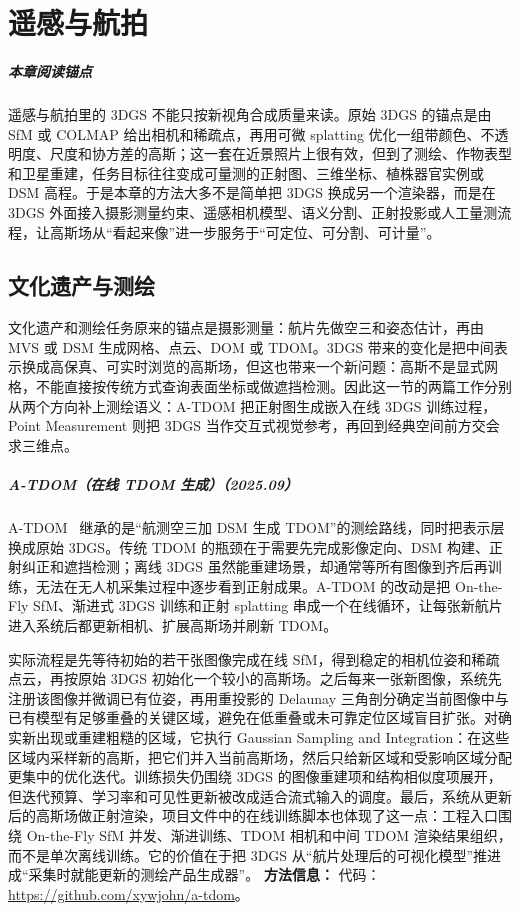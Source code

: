 ﻿\chapter{遥感与航拍}

\paragraph*{本章阅读锚点}
遥感与航拍里的 3DGS 不能只按新视角合成质量来读。原始 3DGS 的锚点是由 SfM 或 COLMAP 给出相机和稀疏点，再用可微 splatting 优化一组带颜色、不透明度、尺度和协方差的高斯；这一套在近景照片上很有效，但到了测绘、作物表型和卫星重建，任务目标往往变成可量测的正射图、三维坐标、植株器官实例或 DSM 高程。于是本章的方法大多不是简单把 3DGS 换成另一个渲染器，而是在 3DGS 外面接入摄影测量约束、遥感相机模型、语义分割、正射投影或人工量测流程，让高斯场从“看起来像”进一步服务于“可定位、可分割、可计量”。

\section{文化遗产与测绘}

文化遗产和测绘任务原来的锚点是摄影测量：航片先做空三和姿态估计，再由 MVS 或 DSM 生成网格、点云、DOM 或 TDOM。3DGS 带来的变化是把中间表示换成高保真、可实时浏览的高斯场，但这也带来一个新问题：高斯不是显式网格，不能直接按传统方式查询表面坐标或做遮挡检测。因此这一节的两篇工作分别从两个方向补上测绘语义：A-TDOM 把正射图生成嵌入在线 3DGS 训练过程，Point Measurement 则把 3DGS 当作交互式视觉参考，再回到经典空间前方交会求三维点。



\paragraph{A-TDOM（在线 TDOM 生成）（2025.09）}
A-TDOM~\cite{2509_12759} 继承的是“航测空三加 DSM 生成 TDOM”的测绘路线，同时把表示层换成原始 3DGS。传统 TDOM 的瓶颈在于需要先完成影像定向、DSM 构建、正射纠正和遮挡检测；离线 3DGS 虽然能重建场景，却通常等所有图像到齐后再训练，无法在无人机采集过程中逐步看到正射成果。A-TDOM 的改动是把 On-the-Fly SfM、渐进式 3DGS 训练和正射 splatting 串成一个在线循环，让每张新航片进入系统后都更新相机、扩展高斯场并刷新 TDOM。

实际流程是先等待初始的若干张图像完成在线 SfM，得到稳定的相机位姿和稀疏点云，再按原始 3DGS 初始化一个较小的高斯场。之后每来一张新图像，系统先注册该图像并微调已有位姿，再用重投影的 Delaunay 三角剖分确定当前图像中与已有模型有足够重叠的关键区域，避免在低重叠或未可靠定位区域盲目扩张。对确实新出现或重建粗糙的区域，它执行 Gaussian Sampling and Integration：在这些区域内采样新的高斯，把它们并入当前高斯场，然后只给新区域和受影响区域分配更集中的优化迭代。训练损失仍围绕 3DGS 的图像重建项和结构相似度项展开，但迭代预算、学习率和可见性更新被改成适合流式输入的调度。最后，系统从更新后的高斯场做正射渲染，项目文件中的在线训练脚本也体现了这一点：工程入口围绕 On-the-Fly SfM 并发、渐进训练、TDOM 相机和中间 TDOM 渲染结果组织，而不是单次离线训练。它的价值在于把 3DGS 从“航片处理后的可视化模型”推进成“采集时就能更新的测绘产品生成器”。
\textbf{方法信息：} 代码：\url{https://github.com/xywjohn/a-tdom}。



